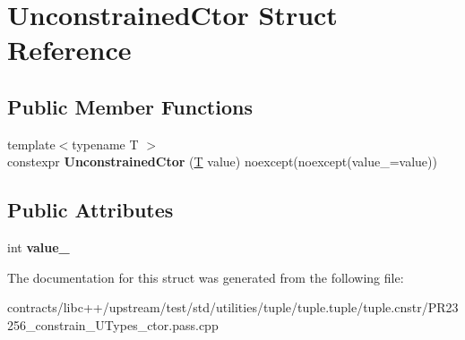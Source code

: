 \hypertarget{struct_unconstrained_ctor}{}\section{Unconstrained\+Ctor Struct Reference}
\label{struct_unconstrained_ctor}
\subsection*{Public Member Functions}
\begin{DoxyCompactItemize}
\item 
\mbox{\label{struct_unconstrained_ctor_ac0010d25310b6df2fec623dfba1981a6}} 
{\footnotesize template$<$typename T $>$ }\\constexpr {\bfseries Unconstrained\+Ctor} (\mbox{\hyperlink{struct_t}{T}} value) noexcept(noexcept(value\+\_\+=value))
\end{DoxyCompactItemize}
\subsection*{Public Attributes}
\begin{DoxyCompactItemize}
\item 
\mbox{\label{struct_unconstrained_ctor_a0b2838e08b4b3f4d6567d5370c98c77f}} 
int {\bfseries value\+\_\+}
\end{DoxyCompactItemize}


The documentation for this struct was generated from the following file\+:\begin{DoxyCompactItemize}
\item 
contracts/libc++/upstream/test/std/utilities/tuple/tuple.\+tuple/tuple.\+cnstr/P\+R23256\+\_\+constrain\+\_\+\+U\+Types\+\_\+ctor.\+pass.\+cpp\end{DoxyCompactItemize}
